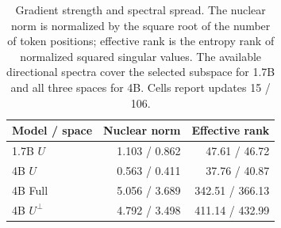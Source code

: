 \begin{table}[t]
\centering
\caption{Gradient strength and spectral spread. The nuclear norm is normalized by the square root of the number of token positions; effective rank is the entropy rank of normalized squared singular values. The available directional spectra cover the selected subspace for 1.7B and all three spaces for 4B. Cells report updates 15 / 106.}
\label{tab:ranks}
\small
\setlength{\tabcolsep}{3pt}
\begin{tabular}{lrr}
\toprule
Model / space & Nuclear norm & Effective rank \\
\midrule
1.7B $U$ & 1.103 / 0.862 & 47.61 / 46.72 \\
4B $U$ & 0.563 / 0.411 & 37.76 / 40.87 \\
4B Full & 5.056 / 3.689 & 342.51 / 366.13 \\
4B $U^\perp$ & 4.792 / 3.498 & 411.14 / 432.99 \\
\bottomrule
\end{tabular}
\end{table}

